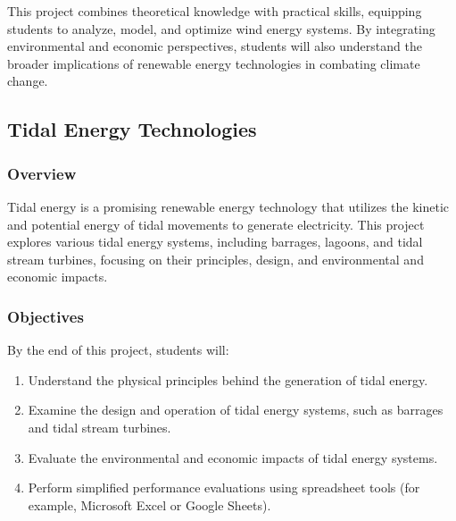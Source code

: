 \documentclass[11pt]{article}
\begin{document}
This project combines theoretical knowledge with practical skills, equipping students to analyze, model, and optimize wind energy systems. By integrating environmental and economic perspectives, students will also understand the broader implications of renewable energy technologies in combating climate change.


\subsection{Tidal Energy Technologies}

\subsubsection*{Overview}
Tidal energy is a promising renewable energy technology that utilizes the kinetic and potential energy of tidal movements to generate electricity. This project explores various tidal energy systems, including barrages, lagoons, and tidal stream turbines, focusing on their principles, design, and environmental and economic impacts.

\subsubsection*{Objectives}
By the end of this project, students will:
\begin{enumerate}
    \item Understand the physical principles behind the generation of tidal energy.
    \item Examine the design and operation of tidal energy systems, such as barrages and tidal stream turbines.
    \item Evaluate the environmental and economic impacts of tidal energy systems.
    \item Perform simplified performance evaluations using spreadsheet tools (for example, Microsoft Excel or Google Sheets).
\end{enumerate}
\end{document}
